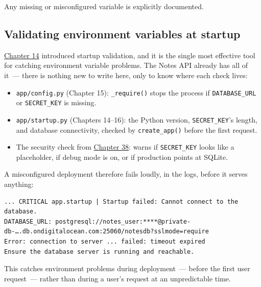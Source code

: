 \noindent{}Any missing or misconfigured variable is explicitly documented.

\subsection*{Validating environment variables at startup}\label{39-local-vs-production:validating-environment-variables-at-startup}

\hyperref[ch:14-runtime-contract]{Chapter 14} introduced startup validation, and it is the single most effective tool for catching environment variable problems. The Notes API already has all of it~--- there is nothing new to write here, only to know where each check lives:

\begin{itemize}
\tightlist
\item
  \texttt{app/config.py} (Chapter 15): \texttt{\_require()} stops the process if \texttt{DATABASE\_URL} or \texttt{SECRET\_KEY} is missing.
\item
  \texttt{app/startup.py} (Chapters 14--16): the Python version, \texttt{SECRET\_KEY}'s length, and database connectivity, checked by \texttt{create\_app()} before the first request.
\item
  The security check from \hyperref[ch:38-security]{Chapter 38}: warns if \texttt{SECRET\_KEY} looks like a placeholder, if debug mode is on, or if production points at SQLite.
\end{itemize}

\noindent{}A misconfigured deployment therefore fails loudly, in the logs, before it serves anything:

\begin{outputbox}[short]
\begin{Verbatim}[fontsize=\codesize, breaklines, breakanywhere, breaksymbolleft={\tiny\textcolor{muted}{$\hookrightarrow$}}]
... CRITICAL app.startup | Startup failed: Cannot connect to the database.
DATABASE_URL: postgresql://notes_user:****@private-db-….db.ondigitalocean.com:25060/notesdb?sslmode=require
Error: connection to server ... failed: timeout expired
Ensure the database server is running and reachable.
\end{Verbatim}
\end{outputbox}

\noindent{}This catches environment problems during deployment~--- before the first user request~--- rather than during a user's request at an unpredictable time.

